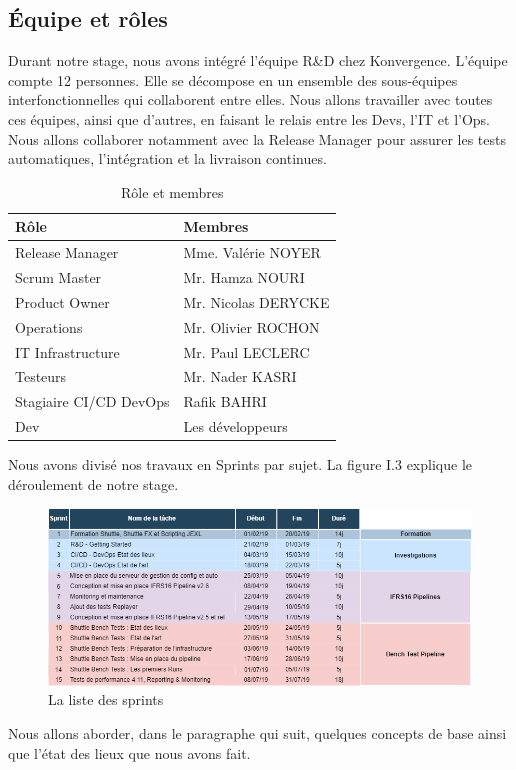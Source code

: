 \begin{spacing}{1.2}
\subsection{Équipe et rôles}
Durant notre stage, nous avons intégré l’équipe R\&D chez Konvergence. L’équipe compte 12 personnes. Elle se décompose en un ensemble des sous-équipes interfonctionnelles qui collaborent entre elles. Nous allons travailler avec toutes ces équipes, ainsi que d'autres, en faisant le relais entre les Devs, l'IT et l'Ops. Nous allons collaborer notamment avec la Release Manager pour assurer les tests automatiques, l'intégration et la livraison continues.
\begin{table}[ht]
	\centering
	\caption{Rôle et membres}
	\footnotesize
	\begin{tabularx}{\textwidth}{|X|X|}
          \hline
          {\textbf{Rôle}}
          & 
          {\textbf{Membres}} 
          \\
          \hline
          Release Manager & Mme. Valérie NOYER \\    \hline
          Scrum Master & Mr. Hamza NOURI \\          \hline
          Product Owner & Mr. Nicolas DERYCKE \\          \hline
          Operations & Mr. Olivier ROCHON \\          \hline
          IT Infrastructure  & Mr. Paul LECLERC \\          \hline
          Testeurs & Mr. Nader KASRI \\          \hline
          Stagiaire CI/CD DevOps & Rafik BAHRI \\          \hline
          Dev & Les développeurs \\          \hline
        \end{tabularx}
	\label{tab:exple}
\end{table}
\FloatBarrier
Nous avons divisé nos travaux en Sprints par sujet. La figure I.3 explique le déroulement de notre stage. 
\begin{figure}[H]\centering
\includegraphics[scale=0.5]{Chapitre2/figures/gant.png}
\caption{La liste des sprints}
\label{fig:fig1}
\end{figure}
\FloatBarrier
Nous allons aborder, dans le paragraphe qui suit, quelques concepts de base ainsi que l'état des lieux que nous avons fait.

\end{spacing}

